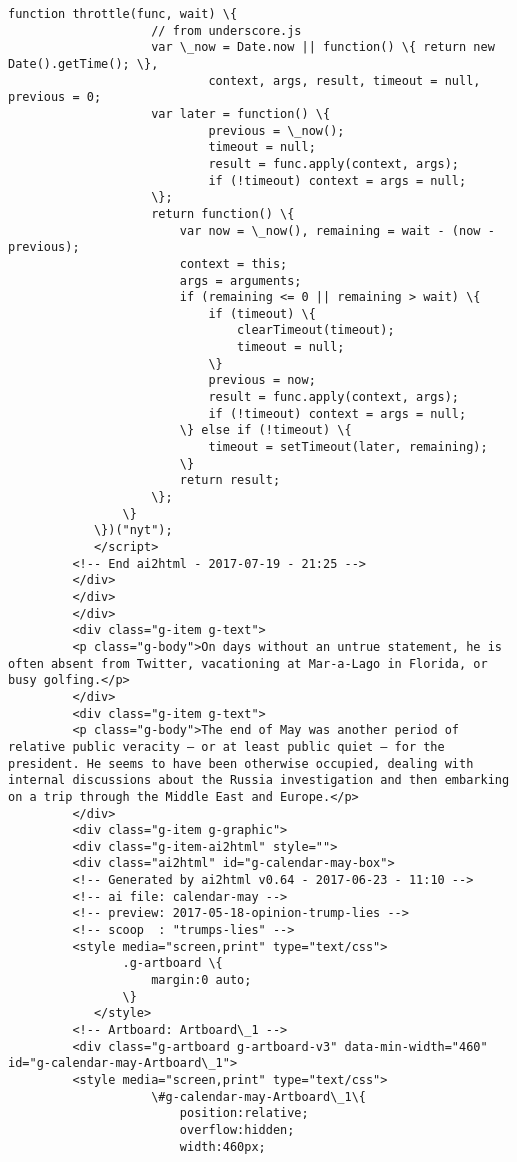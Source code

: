 \documentclass[11pt]{article}
\begin{document}
\begin{Verbatim}[commandchars=\\\{\}]
         		function throttle(func, wait) \{
         			// from underscore.js
         			var \_now = Date.now || function() \{ return new Date().getTime(); \},
         					context, args, result, timeout = null, previous = 0;
         			var later = function() \{
         					previous = \_now();
         					timeout = null;
         					result = func.apply(context, args);
         					if (!timeout) context = args = null;
         			\};
         			return function() \{
         				var now = \_now(), remaining = wait - (now - previous);
         				context = this;
         				args = arguments;
         				if (remaining <= 0 || remaining > wait) \{
         					if (timeout) \{
         						clearTimeout(timeout);
         						timeout = null;
         					\}
         					previous = now;
         					result = func.apply(context, args);
         					if (!timeout) context = args = null;
         				\} else if (!timeout) \{
         					timeout = setTimeout(later, remaining);
         				\}
         				return result;
         			\};
         		\}
         	\})("nyt");
         	</script>
         <!-- End ai2html - 2017-07-19 - 21:25 -->
         </div>
         </div>
         </div>
         <div class="g-item g-text">
         <p class="g-body">On days without an untrue statement, he is often absent from Twitter, vacationing at Mar-a-Lago in Florida, or busy golfing.</p>
         </div>
         <div class="g-item g-text">
         <p class="g-body">The end of May was another period of relative public veracity — or at least public quiet — for the president. He seems to have been otherwise occupied, dealing with internal discussions about the Russia investigation and then embarking on a trip through the Middle East and Europe.</p>
         </div>
         <div class="g-item g-graphic">
         <div class="g-item-ai2html" style="">
         <div class="ai2html" id="g-calendar-may-box">
         <!-- Generated by ai2html v0.64 - 2017-06-23 - 11:10 -->
         <!-- ai file: calendar-may -->
         <!-- preview: 2017-05-18-opinion-trump-lies -->
         <!-- scoop  : "trumps-lies" -->
         <style media="screen,print" type="text/css">
         		.g-artboard \{
         			margin:0 auto;
         		\}
         	</style>
         <!-- Artboard: Artboard\_1 -->
         <div class="g-artboard g-artboard-v3" data-min-width="460" id="g-calendar-may-Artboard\_1">
         <style media="screen,print" type="text/css">
         			\#g-calendar-may-Artboard\_1\{
         				position:relative;
         				overflow:hidden;
         				width:460px;

\end{Verbatim}
\end{document}
